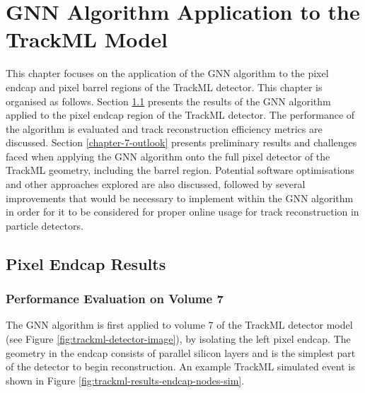 
\chapter{GNN Algorithm Application to the TrackML Model}
\label{chapter-7}

This chapter focuses on the application of the GNN algorithm to the pixel endcap and pixel barrel regions of the TrackML detector. This chapter is organised as follows. Section \ref{chapter-7-endcap-results} presents the results of the GNN algorithm applied to the pixel endcap region of the TrackML detector. The performance of the algorithm is evaluated and track reconstruction efficiency metrics are discussed. Section \ref{chapter-7-outlook} presents preliminary results and challenges faced when applying the GNN algorithm onto the full pixel detector of the TrackML geometry, including the barrel region. Potential software optimisations and other approaches explored are also discussed, followed by several improvements that would be necessary to implement within the GNN algorithm in order for it to be considered for proper online usage for track reconstruction in particle detectors.



\section{Pixel Endcap Results}
\label{chapter-7-endcap-results}


\subsection{Performance Evaluation on Volume 7}
\label{performance-eval-endcap-vol-7-start}

The GNN algorithm is first applied to volume 7 of the TrackML detector model (see Figure \ref{fig:trackml-detector-image}), by isolating the left pixel endcap. The geometry in the endcap consists of parallel silicon layers and is the simplest part of the detector to begin reconstruction. An example TrackML simulated event is shown in Figure \ref{fig:trackml-results-endcap-nodes-sim}.

